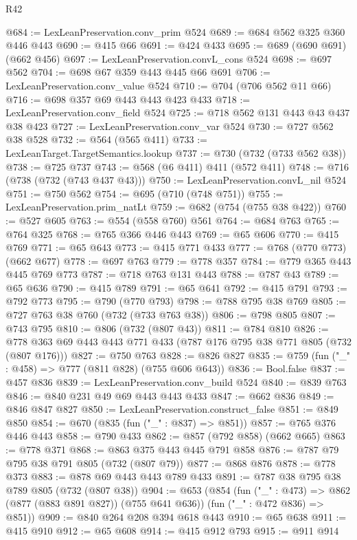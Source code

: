 \begin{lexlean}{R42}
\begin{coremodule}
@684 := LexLeanPreservation.conv_prim @524
@689 := @684 @562 @325 @360 @446 @443
@690 := @415 @66
@691 := @424 @433
@695 := @689 (@690 @691) (@662 @456)
@697 := LexLeanPreservation.convL_cons @524
@698 := @697 @562
@704 := @698 @67 @359 @443 @445 @66 @691
@706 := LexLeanPreservation.conv_value @524
@710 := @704 (@706 @562 @11 @66)
@716 := @698 @357 @69 @443 @443 @423 @433
@718 := LexLeanPreservation.conv_field @524
@725 := @718 @562 @131 @443 @43 @437 @38 @423
@727 := LexLeanPreservation.conv_var @524
@730 := @727 @562 @38 @528
@732 := @564 (@565 @411)
@733 := LexLeanTarget.TargetSemantics.lookup
@737 := @730 (@732 (@733 @562 @38))
@738 := @725 @737
@743 := @568 (@6 @411) @411 (@572 @411)
@748 := @716 (@738 (@732 (@743 @437 @43)))
@750 := LexLeanPreservation.convL_nil @524
@751 := @750 @562
@754 := @695 (@710 (@748 @751))
@755 := LexLeanPreservation.prim_natLt
@759 := @682 (@754 (@755 @38 @422))
@760 := @527 @605
@763 := @554 (@558 @760) @561
@764 := @684 @763
@765 := @764 @325
@768 := @765 @366 @446 @443
@769 := @65 @606
@770 := @415 @769
@771 := @65 @643
@773 := @415 @771 @433
@777 := @768 (@770 @773) (@662 @677)
@778 := @697 @763
@779 := @778 @357
@784 := @779 @365 @443 @445 @769 @773
@787 := @718 @763 @131 @443
@788 := @787 @43
@789 := @65 @636
@790 := @415 @789
@791 := @65 @641
@792 := @415 @791
@793 := @792 @773
@795 := @790 (@770 @793)
@798 := @788 @795 @38 @769
@805 := @727 @763 @38 @760 (@732 (@733 @763 @38))
@806 := @798 @805
@807 := @743 @795
@810 := @806 (@732 (@807 @43))
@811 := @784 @810
@826 := @778 @363 @69 @443 @443 @771 @433 (@787 @176 @795 @38 @771 @805 (@732 (@807 @176)))
@827 := @750 @763
@828 := @826 @827
@835 := @759 (fun ("_" : @458) => @777 (@811 @828) (@755 @606 @643))
@836 := Bool.false
@837 := @457 @836
@839 := LexLeanPreservation.conv_build @524
@840 := @839 @763
@846 := @840 @231 @49 @69 @443 @443 @433
@847 := @662 @836
@849 := @846 @847 @827
@850 := LexLeanPreservation.construct_false
@851 := @849 @850
@854 := @670 (@835 (fun ("_" : @837) => @851))
@857 := @765 @376 @446 @443
@858 := @790 @433
@862 := @857 (@792 @858) (@662 @665)
@863 := @778 @371
@868 := @863 @375 @443 @445 @791 @858
@876 := @787 @79 @795 @38 @791 @805 (@732 (@807 @79))
@877 := @868 @876
@878 := @778 @373
@883 := @878 @69 @443 @443 @789 @433
@891 := @787 @38 @795 @38 @789 @805 (@732 (@807 @38))
@904 := @653
    (@854
      (fun ("_" : @473) => @862 (@877 (@883 @891 @827)) (@755 @641 @636))
      (fun ("_" : @472 @836) => @851))
@909 := @840 @264 @208 @394 @618 @443
@910 := @65 @638
@911 := @415 @910
@912 := @65 @608
@914 := @415 @912 @793
@915 := @911 @914

\end{coremodule}
\end{lexlean}
